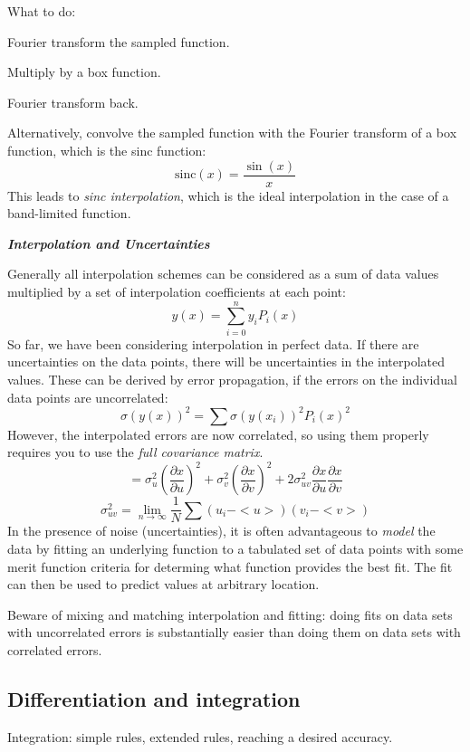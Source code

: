\documentclass[12pt]{article}
\begin{document}
What to do:
\begin{enumerate*}
    \item Fourier transform the sampled function.
    \item Multiply by a box function.
    \item Fourier transform back.
\end{enumerate*}
Alternatively, convolve
the sampled function with the Fourier transform of a box function,
which is the sinc function:
$$ \textrm{sinc}(x) = \frac{\sin(x)}{x} $$
This leads to \emph{sinc interpolation}, which is the ideal interpolation in the
case of a band-limited function.

\textbf{\emph{Interpolation and Uncertainties}}

Generally all interpolation schemes can be considered as a sum of data
values multiplied by a set of interpolation coefficients at each
point:
$$ y(x) = \sum_{i=0}^{n} y_{i}P_{i}(x) $$
So far, we have been considering interpolation in perfect data.
If there are uncertainties on the data points, there will be
uncertainties in the interpolated values.
These can be derived by error propagation, if the errors on the
individual data points are uncorrelated:
$$ \sigma(y(x))^2 = \sum\sigma(y(x_{i}))^{2}P_{i}(x)^{2} $$
However, the interpolated errors are now correlated, so using them
properly requires you to use the \emph{full covariance matrix}.
$$ = \sigma_{u}^{2}\left(\frac{\partial{x}}{\partial{u}}\right)^{2} +
\sigma_{v}^{2}\left(\frac{\partial{x}}{\partial{v}}\right)^{2} +
2\sigma_{uv}^{2}\frac{\partial{x}}{\partial{u}}\frac{\partial{x}}{\partial{v}} $$
$$ \sigma_{uv}^{2} = \lim_{n\rightarrow\infty}\frac{1}{N}
\sum(u_{i}-<u>)(v_{i}-<v>)$$
In the presence of noise (uncertainties), it is often advantageous to
\emph{model} the data by fitting an underlying function to a tabulated set of
data points with some merit function criteria for determing what
function provides the best fit. The fit can then be used to predict
values at arbitrary location.

Beware of mixing and matching interpolation and fitting: doing fits on
data sets with uncorrelated errors is substantially easier than doing
them on data sets with correlated errors.

\subsection{Differentiation and integration}
Integration: simple rules, extended rules, reaching a desired accuracy.
\end{document}
